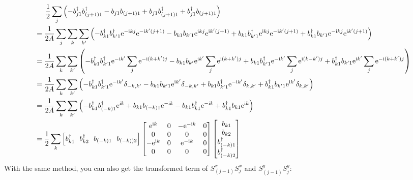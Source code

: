 \documentclass[letterpaper,10pt]{article}
\newcommand{\e}{\mathrm{e}}
\newcommand{\ii}{\mathrm{i}}
\begin{document}
  $$
\begin{aligned}
  & \indent  \frac{1}{2}\sum_{j}\left(-b_{j1}^{\dagger}b_{(j+1)1}^{\dagger}-b_{j1}b_{(j+1)1}+b_{j1}b_{(j+1)1}^{\dagger}+b_{j1}^{\dagger}b_{(j+1)1}\right)\\
  &=\frac{1}{2A}\sum_{j}\sum_{k}\sum_{k'}\left(-b_{k1}^{\dagger}b_{k'1}^{\dagger}\e^{-\ii kj}\e^{-\ii k'(j+1)}-b_{k1}b_{k'1}\e^{\ii kj}\e^{\ii k'(j+1)}+b_{k1}b_{k'1}^{\dagger}\e^{\ii kj}\e^{-\ii k'(j+1)}+b_{k1}^{\dagger}b_{k'1}\e^{-\ii kj}\e^{\ii k'(j+1)}\right)\\
  &=\frac{1}{2A}\sum_{k}\sum_{k'}\left(-b_{k1}^{\dagger}b_{k'1}^{\dagger}\e^{-\ii k'}\sum_j \e^{-\ii (k+k')j}-b_{k1}b_{k'}\e^{\ii k'}\sum_j \e^{\ii (k+k')j}+b_{k1}b_{k'1}^{\dagger}\e^{-\ii k'}\sum_j \e^{\ii (k-k')j}+b_{k1}^{\dagger}b_{k'1}\e^{\ii k'}\sum_j \e^{-\ii (k+k')j}\right)\\
  &=\frac{1}{2A}\sum_k\sum_{k'}\left(-b_{k1}^{\dagger}b_{k'1}^{\dagger}\e^{-\ii k'}\delta_{-k,k'}-b_{k1}b_{k'1}\e^{\ii k'}\delta_{-k,k'}+b_{k1}b_{k'1}^{\dagger}\e^{-\ii k'}\delta_{k,k'}+b_{k1}^{\dagger}b_{k'1}\e^{\ii k'}\delta_{k,k'}\right)\\
  &=\frac{1}{2A}\sum_k\sum_{k'}\left(-b_{k1}^{\dagger}b_{(-k)1}^{\dagger}\e^{\ii k}+b_{k1}b_{(-k)1}\e^{-\ii k}-b_{k1}b_{k1}^{\dagger}\e^{-\ii k}+b_{k1}^{\dagger}b_{k1}\e^{\ii k}\right)\\
  &=\frac{1}{2}\sum_k \left[
    b_{k1}^{\dagger} \ \ 
    b_{k2}^{\dagger}\  \ 
    b_{(-k)1}\ \ 
    b_{(-k))2}\right]
   \begin{bmatrix}
        \e^{\ii k} & 0 & -\e^{-\ii k} & 0 \\
       0 &  0 & 0 &0 \\
       -\e^{\ii k} &  0 & \e^{-\ii k} &0\\
        0 & 0 & 0& 0
        \end{bmatrix}\begin{bmatrix}
            b_{k1}  \\
            b_{k2}  \\
            b_{(-k)1}^{\dagger}\\
            b_{(-k)2}^{\dagger}
            \end{bmatrix}
\end{aligned}
$$
With the same method, you can also get the transformed term of $S_{(j-1)}^x S_j^x$ and $S_{(j-1)}^y S_j^y$:
\end{document}
